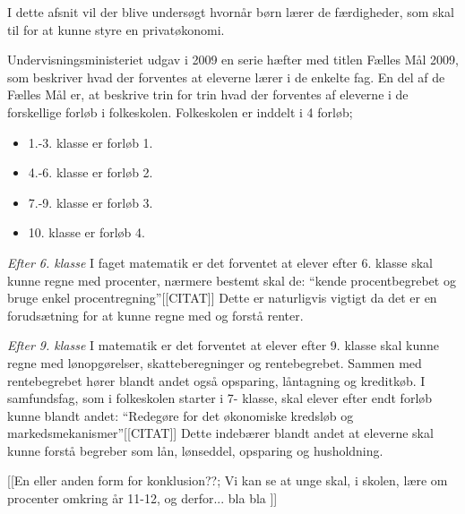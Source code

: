 I dette afsnit vil der blive undersøgt hvornår børn lærer de færdigheder, som skal til for at kunne styre en privatøkonomi.

Undervisningsministeriet udgav i 2009 en serie hæfter med titlen Fælles Mål 2009, som beskriver hvad der forventes at eleverne lærer i de enkelte fag. En del af de Fælles Mål er, at beskrive trin for trin hvad der forventes af eleverne i de forskellige forløb i folkeskolen. Folkeskolen er inddelt i 4 forløb;
\begin{itemize}
\item 1.-3. klasse er forløb 1.
\item 4.-6. klasse er forløb 2.
\item 7.-9. klasse er forløb 3.
\item 10. klasse er forløb 4.
\end{itemize}

\emph{Efter 6. klasse}
I faget matematik er det forventet at elever efter 6. klasse skal kunne regne med procenter, 
nærmere bestemt skal de: “kende procentbegrebet og bruge enkel procentregning”[[CITAT]]\cite{FallesMalMatematik}
Dette er naturligvis vigtigt da det er en forudsætning for at kunne regne med og forstå renter.

\emph{Efter 9. klasse}
I matematik er det forventet at elever efter 9. klasse skal kunne regne med lønopgørelser, skatteberegninger og rentebegrebet.\cite{FallesMalMatematik} Sammen med rentebegrebet hører blandt andet også opsparing, låntagning og kreditkøb.
I samfundsfag, som i folkeskolen starter i 7- klasse, skal elever efter endt forløb kunne blandt andet: “Redegøre for det økonomiske kredsløb og markedsmekanismer”[[CITAT]]\cite{FallesMalSamfundsfag}
Dette indebærer blandt andet at eleverne skal kunne forstå begreber som lån, lønseddel, opsparing og husholdning.

[[En eller anden form for konklusion??;
Vi kan se at unge skal, i skolen, lære om procenter omkring år 11-12, og derfor... bla bla ]]

